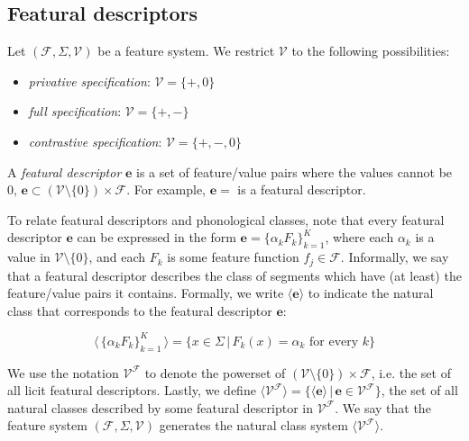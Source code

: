 \documentclass[11pt, oneside]{article}   	%
\begin{document}
\subsection{Featural descriptors}

Let $(\mathcal F, \Sigma, \mathcal V)$ be a feature system. We restrict $\mathcal V$ to the following possibilities: \begin{itemize}
    \item \textit{privative specification}: $\mathcal V = \{ +, 0 \}$
    \item \textit{full specification}: $\mathcal V = \{ +, - \}$
    \item \textit{contrastive specification}: $\mathcal V = \{ +, -, 0 \}$
    \end{itemize}

A \textit{featural descriptor} $\mathbf{e}$ is a set of feature/value pairs where the values cannot be $0$, $\mathbf{e} \subset (\mathcal V \setminus \{0\}) \times \mathcal F$. For example, $\mathbf{e} =$   is a featural descriptor.

To relate featural descriptors and phonological classes, note that every featural descriptor $\mathbf{e}$ can be expressed in the form $\mathbf{e} = \{\alpha_k F_k\}_{k=1}^K$, where each $\alpha_k$ is a value in $\mathcal V \setminus \{ 0 \}$, and each $F_k$ is some feature function $f_j \in \mathcal F$. Informally, we say that a featural descriptor describes the class of segments which have (at least) the feature/value pairs it contains. Formally, we write $\langle \mathbf{e} \rangle$ to indicate the natural class that corresponds to the featural descriptor $\mathbf{e}$:

$$ \langle \, \{\alpha_k F_k\}_{k=1}^K \, \rangle = \{x \in \Sigma \, | \, F_k(x) = \alpha_k \text{ for every } k \} $$

\vspace{\baselineskip} \noindent We use the notation $\mathcal V^\mathcal F$ to denote the powerset of $(\mathcal V \setminus \{0\}) \times \mathcal F$, i.e. the set of all licit featural descriptors. Lastly, we define $\langle \mathcal V^\mathcal F \rangle = \{ \langle \mathbf{e} \rangle \, | \, \mathbf{e} \in \mathcal V^\mathcal F \}$, the set of all natural classes described by some featural descriptor in $\mathcal V^\mathcal F$. We say that the feature system $(\mathcal F, \Sigma, \mathcal V)$ generates the natural class system $\langle \mathcal V^\mathcal F \rangle$.
\end{document}
